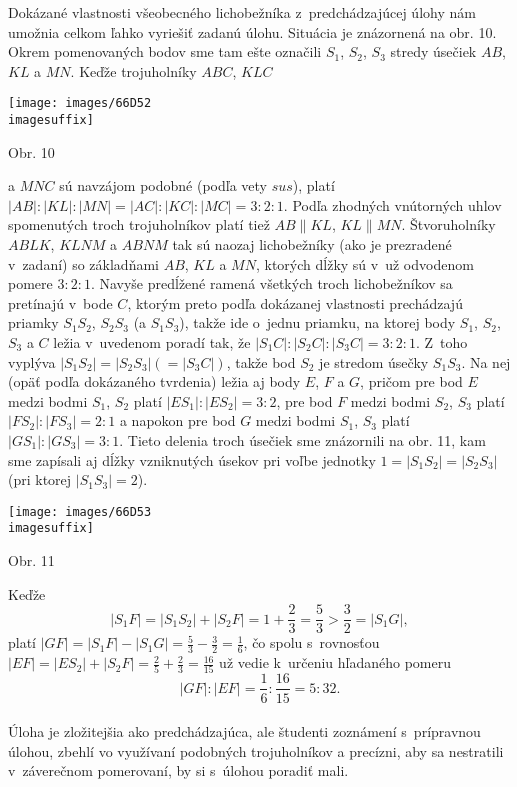 \rieh
Dokázané vlastnosti všeobecného lichobežníka z~predchádzajúcej úlohy nám umožnia celkom ľahko vyriešiť zadanú úlohu. Situácia je znázornená na obr. 10. Okrem pomenovaných bodov sme tam ešte označili $S_1$, $S_2$, $S_3$ stredy úsečiek $AB$, $KL$ a $MN$. Keďže trojuholníky $ABC$, $KLC$
\begin{center}
\texttt{[image: images/66D52\\imagesuffix]}

Obr. 10
\end{center}
a $MNC$ sú navzájom podobné (podľa vety $sus$), platí $|AB| : |KL| : |MN| = |AC| : |KC| : |MC| = 3 : 2 : 1$. Podľa zhodných vnútorných uhlov spomenutých troch trojuholníkov platí tiež $AB \parallel KL$, $KL \parallel MN$. Štvoruholníky $ABLK$, $KLNM$ a $ABNM$ tak sú naozaj lichobežníky (ako je prezradené v~zadaní) so základňami $AB$, $KL$ a $MN$, ktorých dĺžky sú v~už odvodenom pomere $3 : 2 : 1$. Navyše predĺžené ramená všetkých troch lichobežníkov sa pretínajú v~bode $C$, ktorým preto podľa dokázanej vlastnosti prechádzajú priamky $S_1 S_2$, $S_2 S_3$ (a $S_1 S_3$), takže ide o~jednu priamku, na ktorej body $S_1$, $S_2$, $S_3$ a $C$ ležia v~uvedenom poradí tak, že $|S_1 C| : |S_2 C| : |S_3 C| = 3 : 2 : 1$. Z~toho vyplýva $|S_1 S_2 | = |S_2 S_3 | (= |S_3 C|)$, takže bod $S_2$ je stredom úsečky $S_1 S_3$. Na nej (opäť podľa dokázaného tvrdenia) ležia aj body $E$, $F$ a $G$, pričom pre bod $E$ medzi bodmi $S_1$, $S_2$ platí $|ES_1 | : |ES_2 | = 3 : 2$, pre bod $F$ medzi bodmi $S_2$, $S_3$ platí $|FS_2| : |FS_3| = 2 : 1$ a napokon pre bod $G$ medzi bodmi $S_1$, $S_3$ platí $|GS_1| : |GS_3 | = 3 : 1$. Tieto delenia troch úsečiek sme znázornili na obr. 11, kam sme zapísali aj dĺžky vzniknutých úsekov pri voľbe jednotky $1 = |S_1 S_2 | = |S_2 S_3 |$ (pri ktorej $|S_1 S_3 | = 2$).
\begin{center}
\texttt{[image: images/66D53\\imagesuffix]}

Obr. 11
\end{center}
Keďže
$$|S_1 F| = |S_1 S_2 | + |S_2 F| = 1 +\frac{2}{3}=\frac{5}{3}>\frac{3}{2}= |S_1 G|,$$
platí $|GF| = |S_1 F| - |S_1 G| =\frac{5}{3} -\frac{3}{2}=\frac{1}{6}$, čo spolu s~rovnosťou $|EF| = |ES_2 | + |S_2 F|=\frac{2}{5}+\frac{2}{3}=\frac{16}{15}$ už vedie k~určeniu hľadaného pomeru
$$|GF| : |EF| =\frac{1}{6}:\frac{16}{15}= 5 : 32.$$
\\
\kom Úloha je zložitejšia ako predchádzajúca, ale študenti zoznámení s~prípravnou úlohou, zbehlí vo využívaní podobných trojuholníkov a precízni, aby sa nestratili v~záverečnom pomerovaní, by si s~úlohou poradiť mali.
